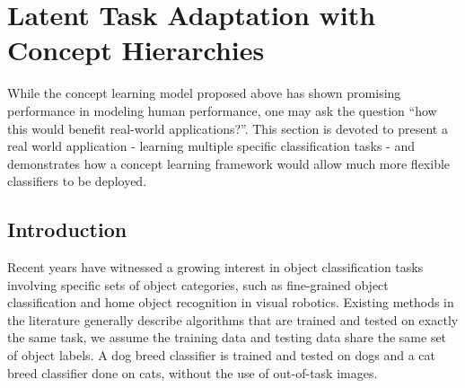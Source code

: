 \chapter{Latent Task Adaptation with Concept Hierarchies}

While the concept learning model proposed above has shown promising performance in modeling human performance, one may ask the question ``how this would benefit real-world applications?''. This section is devoted to present a real world application - learning multiple specific classification tasks - and demonstrates how a concept learning framework would allow much more flexible classifiers to be deployed.

\section{Introduction}
Recent years have witnessed a growing interest in object classification tasks involving specific sets of object categories, such as fine-grained object classification \cite{farrell2011birdlets, khosla2011novel} and home object recognition in visual robotics. Existing methods in the literature generally describe algorithms that are trained and tested on exactly the same task, \ie we assume the training data and testing data share the same set of object labels. A dog breed classifier is trained and tested on dogs and a cat breed classifier done on cats, without the use of out-of-task images.

